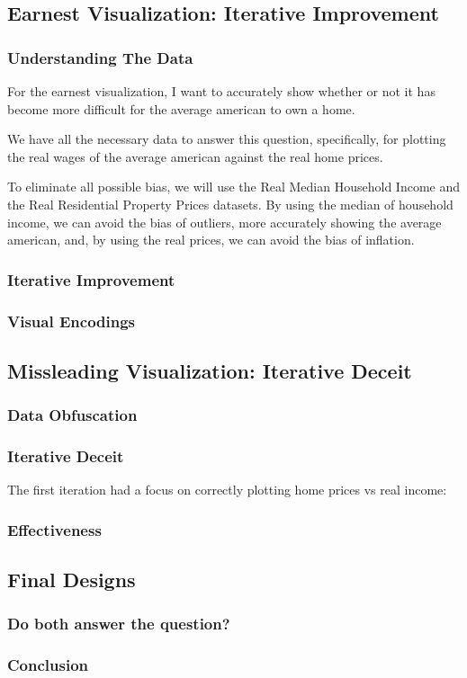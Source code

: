 \documentclass{article}
\begin{document}
\subsection{Earnest Visualization: Iterative Improvement}
\subsubsection{Understanding The Data}

For the earnest visualization, I want to accurately show whether or not it has become
more difficult for the average american to own a home. 

We have all the necessary data to answer this question, specifically, for plotting the
real wages of the average american against the real home prices.

To eliminate all possible bias, we will use the Real Median Household Income 
and the Real Residential Property Prices datasets. By using the median of household income,
we can avoid the bias of outliers, more accurately showing the average american, 
and, by using the real prices, we can avoid the bias of inflation. 

\subsubsection{Iterative Improvement}

\subsubsection{Visual Encodings}

\subsection{Missleading Visualization: Iterative Deceit}
\subsubsection{Data Obfuscation}
\subsubsection{Iterative Deceit}
The first iteration had a focus on correctly plotting home prices vs real income:
\subsubsection{Effectiveness}

\subsection{Final Designs}
\subsubsection{Do both answer the question?}
\subsubsection{Conclusion}

\newpage
\begin{refcontext}[sorting=nyt]
\printbibliography
\end{refcontext}
\end{document}
